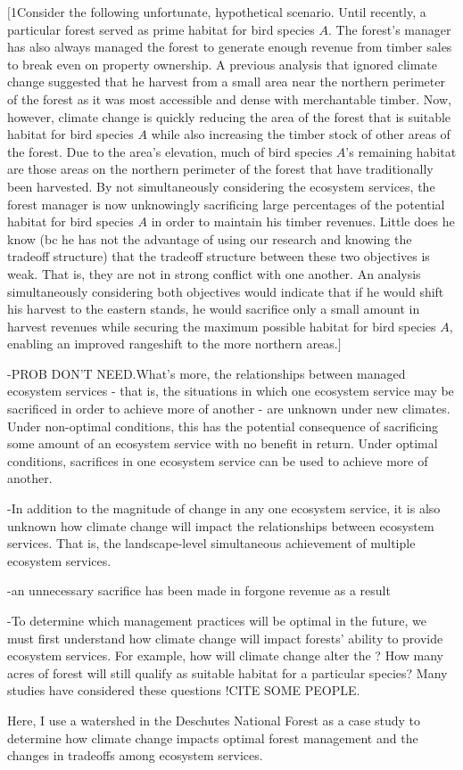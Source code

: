 $[$1Consider the following unfortunate, hypothetical scenario. Until recently, a particular forest served as prime habitat for bird species $A$. The forest's manager has also always managed the forest to generate enough revenue from timber sales to break even on property ownership.  A previous analysis that ignored climate change suggested that he harvest from a small area near the northern perimeter of the forest as it was most accessible and dense with merchantable timber. Now, however, climate change is quickly reducing the area of the forest that is suitable habitat for bird species $A$ while also increasing the timber stock of other areas of the forest. Due to the area's elevation, much of bird species $A$'s remaining habitat are those areas on the northern perimeter of the forest that have traditionally been harvested. By not simultaneously considering the ecosystem services, the forest manager is now unknowingly sacrificing large percentages of the potential habitat for bird species $A$ in order to maintain his timber revenues. Little does he know (bc he has not the advantage of using our research and knowing the tradeoff structure) that the tradeoff structure between these two objectives is weak. That is, they are not in strong conflict with one another. An analysis simultaneously considering both objectives would indicate that if he would shift his harvest to the eastern stands, he would sacrifice only a small amount in harvest revenues while securing the maximum possible habitat for bird species $A$, enabling an improved rangeshift to the more northern areas.$]$

-PROB DON'T NEED.What's more, the relationships between managed ecosystem services - that is, the situations in which one ecosystem service may be sacrificed in order to achieve more of another - are unknown under new climates. Under non-optimal conditions, this has the potential consequence of sacrificing some amount of an ecosystem service with no benefit in return. Under optimal conditions, sacrifices in one ecosystem service can be used to achieve more of another.

-In addition to the magnitude of change in any one ecosystem service, it is also unknown how climate change will impact the relationships between ecosystem services. That is, the landscape-level simultaneous achievement of multiple ecosystem services.

-an unnecessary sacrifice has been made in forgone revenue as a result

-To determine which management practices will be optimal in the future, we must first understand how climate change will impact forests' ability to provide ecosystem services. For example, how will climate change alter the ? How many acres of forest will still qualify as suitable habitat for a particular species? Many studies have considered these questions !CITE SOME PEOPLE.

Here, I use a watershed in the Deschutes National Forest as a case study to determine how climate change impacts optimal forest management and the changes in tradeoffs among ecosystem services.